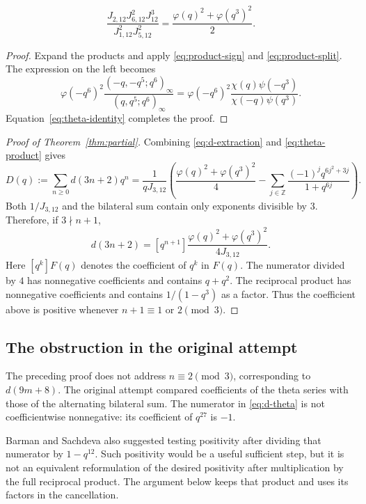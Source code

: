 \begin{lemma}\label{lem:theta-product}
\begin{equation}\label{eq:theta-product}
 \frac{J_{2,12}J_{6,12}^2J_{12}^3}{J_{1,12}^2J_{5,12}^2}
 =\frac{\varphi(q)^2+\varphi(q^3)^2}{2}.
\end{equation}
\end{lemma}
\begin{proof}
Expand the products and apply \eqref{eq:product-sign} and
\eqref{eq:product-split}. The expression on the left becomes
\[
 \varphi(-q^6)^2
 \frac{(-q,-q^5;q^6)_\infty}{(q,q^5;q^6)_\infty}
 =\varphi(-q^6)^2\frac{\chi(q)\psi(-q^3)}{\chi(-q)\psi(q^3)}.
\]
Equation~\eqref{eq:theta-identity} completes the proof.
\end{proof}

\begin{proof}[Proof of Theorem~\ref{thm:partial}]
Combining \eqref{eq:d-extraction} and \eqref{eq:theta-product} gives
\begin{equation}\label{eq:d-theta}
 D(q):=\sum_{n\ge0}d(3n+2)q^n
 =\frac1{qJ_{3,12}}\left(
 \frac{\varphi(q)^2+\varphi(q^3)^2}{4}
 -\sum_{j\in\mathbb Z}\frac{(-1)^jq^{6j^2+3j}}{1+q^{6j}}
 \right).
\end{equation}
Both $1/J_{3,12}$ and the bilateral sum contain only exponents divisible
by $3$. Therefore, if $3\nmid n+1$,
\[
 d(3n+2)=[q^{n+1}]
 \frac{\varphi(q)^2+\varphi(q^3)^2}{4J_{3,12}}.
\]
Here $[q^k]F(q)$ denotes the coefficient of $q^k$ in $F(q)$.
The numerator divided by $4$ has nonnegative coefficients and contains
$q+q^2$. The reciprocal product has nonnegative coefficients and contains
$1/(1-q^3)$ as a factor. Thus the coefficient above is positive whenever
$n+1\equiv1$ or $2\pmod3$.
\end{proof}

\subsection{The obstruction in the original attempt}
The preceding proof does not address $n\equiv2\pmod3$, corresponding to
$d(9m+8)$. The original attempt compared coefficients of the theta series
with those of the alternating bilateral sum. The numerator in
\eqref{eq:d-theta} is not coefficientwise nonnegative: its coefficient of
$q^{27}$ is $-1$.

Barman and Sachdeva also suggested testing positivity after dividing that
numerator by $1-q^{12}$. Such positivity would be a useful sufficient step,
but it is not an equivalent reformulation of the desired positivity after
multiplication by the full reciprocal product. The argument below keeps
that product and uses its factors in the cancellation.

